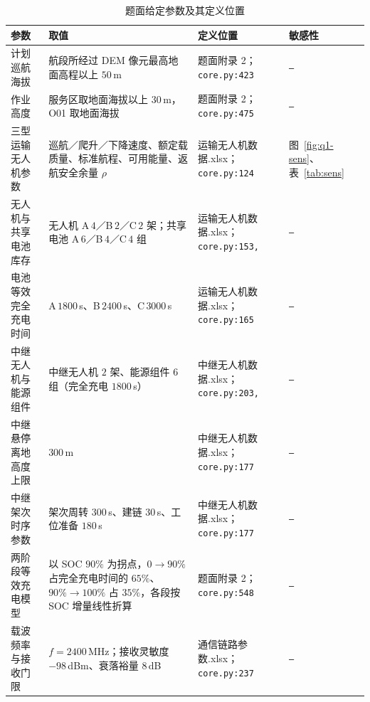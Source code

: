 \begin{table}[htbp]
	\caption{题面给定参数及其定义位置}
	\label{tab:param-given}
	\centering
	\small
	\begin{tabularx}{\textwidth}{@{}>{\hsize=1.00\hsize}X >{\hsize=1.40\hsize}X >{\hsize=1.05\hsize}X >{\hsize=0.55\hsize}X@{}}
		\toprule
		参数 & 取值 & 定义位置 & 敏感性 \\
		\midrule
		计划巡航海拔 & 航段所经过 DEM 像元最高地面高程以上 $50$\,m & 题面附录 2；\texttt{core.py:423} & \texttt{---} \\
		作业高度 & 服务区取地面海拔以上 $30$\,m，O01 取地面海拔 & 题面附录 2；\texttt{core.py:475} & \texttt{---} \\
		三型运输无人机参数 & 巡航／爬升／下降速度、额定载质量、标准航程、可用能量、返航安全余量 $\rho$ & 运输无人机数据.xlsx；\texttt{core.py:124} & 图~\ref{fig:q1-sens}、表~\ref{tab:sens} \\
		无人机与共享电池库存 & 无人机 A\,$4$／B\,$2$／C\,$2$ 架；共享电池 A\,$6$／B\,$4$／C\,$4$ 组 & 运输无人机数据.xlsx；\texttt{core.py:153,\allowbreak 165} & \texttt{---} \\
		电池等效完全充电时间 & A\,$1800$\,s、B\,$2400$\,s、C\,$3000$\,s & 运输无人机数据.xlsx；\texttt{core.py:165} & \texttt{---} \\
		中继无人机与能源组件 & 中继无人机 $2$ 架、能源组件 $6$ 组（完全充电 $1800$\,s） & 中继无人机数据.xlsx；\texttt{core.py:203,\allowbreak 210} & \texttt{---} \\
		中继悬停离地高度上限 & $300$\,m & 中继无人机数据.xlsx；\texttt{core.py:177} & \texttt{---} \\
		中继架次时序参数 & 架次周转 $300$\,s、建链 $30$\,s、工位准备 $180$\,s & 中继无人机数据.xlsx；\texttt{core.py:177} & \texttt{---} \\
		两阶段等效充电模型 & 以 SOC $90\%$ 为拐点，$0\to90\%$ 占完全充电时间的 $65\%$、$90\%\to100\%$ 占 $35\%$，各段按 SOC 增量线性折算 & 题面附录 2；\texttt{core.py:548} & \texttt{---} \\
		载波频率与接收门限 & $f=2400$\,MHz；接收灵敏度 $-98$\,dBm、衰落裕量 $8$\,dB & 通信链路参数.xlsx；\texttt{core.py:237} & \texttt{---} \\

\end{tabularx}
\end{table}
